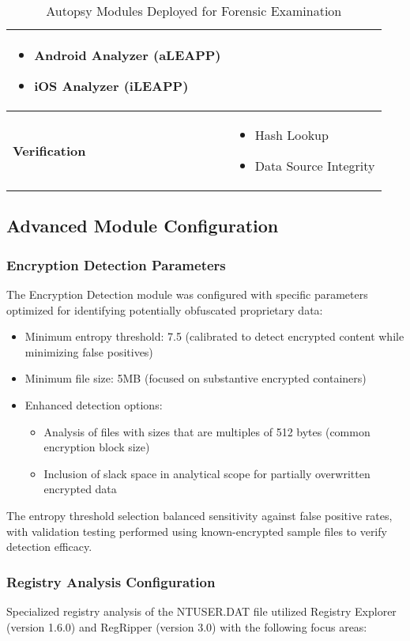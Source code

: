 \begin{table}[htbp]
\begin{tabular}{|p{5cm}|p{10cm}|}
\begin{itemize}
    \item Android Analyzer (aLEAPP)
    \item iOS Analyzer (iLEAPP)
\end{itemize} \\
\hline
\textbf{Verification} & 
\begin{itemize}
    \item Hash Lookup
    \item Data Source Integrity
\end{itemize} \\
\hline
\end{tabular}
\caption{Autopsy Modules Deployed for Forensic Examination}
\label{tab:autopsy_modules}
\end{table}

\subsection{Advanced Module Configuration}

\subsubsection{Encryption Detection Parameters}
The Encryption Detection module was configured with specific parameters optimized for identifying potentially obfuscated proprietary data:

\begin{itemize}
    \item Minimum entropy threshold: 7.5 (calibrated to detect encrypted content while minimizing false positives)
    \item Minimum file size: 5MB (focused on substantive encrypted containers)
    \item Enhanced detection options:
    \begin{itemize}
        \item Analysis of files with sizes that are multiples of 512 bytes (common encryption block size)
        \item Inclusion of slack space in analytical scope for partially overwritten encrypted data
    \end{itemize}
\end{itemize}

The entropy threshold selection balanced sensitivity against false positive rates, with validation testing performed using known-encrypted sample files to verify detection efficacy.

\subsubsection{Registry Analysis Configuration}
Specialized registry analysis of the NTUSER.DAT file utilized Registry Explorer (version 1.6.0) and RegRipper (version 3.0) with the following focus areas:


